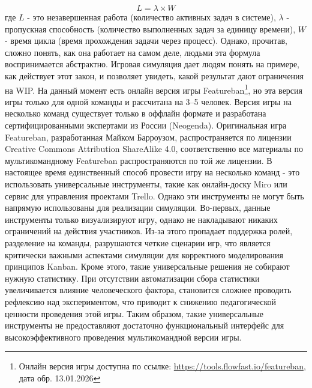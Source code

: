 \documentclass[a4paper,12pt]{extarticle}
\begin{document}
\begin{equation}
    \label{little-law-formula}
    L = \lambda\times W
\end{equation}
где $L$ - это незавершенная работа (количество активных задач в системе), $\lambda$ - пропускная способность (количество выполненных задач за единицу времени), $W$ - время цикла (время прохождения задачи через процесс). Однако, прочитав, сложно понять, как она работает на самом деле, людьми эта формула воспринимается абстрактно. Игровая симуляция дает людям понять на примере, как действует этот закон, и позволяет увидеть, какой результат дают ограничения на WIP. На данный момент есть онлайн версия игры Featureban\footnote{Онлайн версия игры доступна по ссылке: \url{https://tools.flowfast.io/featureban}, дата обр. 13.01.2026}, но эта версия игры только для одной команды и рассчитана на 3–5 человек. Версия игры на несколько команд существует только в оффлайн формате и разработана сертифицированными экспертами из России (Neogenda)\cite{multi-featureban}. Оригинальная игра Featureban, разработанная Майком Барроузом, распространяется по лицензии Creative Commons Attribution ShareAlike 4.0, соответственно все материалы по мультикомандному Featureban распространяются по той же лицензии. В настоящее время единственный способ провести игру на несколько команд - это использовать универсальные инструменты, такие как онлайн-доску Miro или сервис для управления проектами Trello. Однако эти инструменты не могут быть напрямую использованы для реализации симуляции. Во-первых, данные инструменты только визуализируют игру, однако не накладывают никаких ограничений на действия участников. Из-за этого пропадает поддержка ролей, разделение на команды, разрушаются четкие сценарии игр, что является критически важными аспектами симуляции для корректного моделирования принципов Kanban. Кроме этого, такие универсальные решения не собирают нужную статистику. При отсутствии автоматизации сбора статистики увеличивается влияние человеческого фактора, становится сложнее проводить рефлексию над экспериментом, что приводит к снижению педагогической ценности проведения этой игры. Таким образом, такие универсальные инструменты не предоставляют достаточно функциональный интерфейс для высокоэффективного проведения мультикомандной версии игры.




\newpage 
\printbibliography[heading=bibintoc] 

\end{document}
